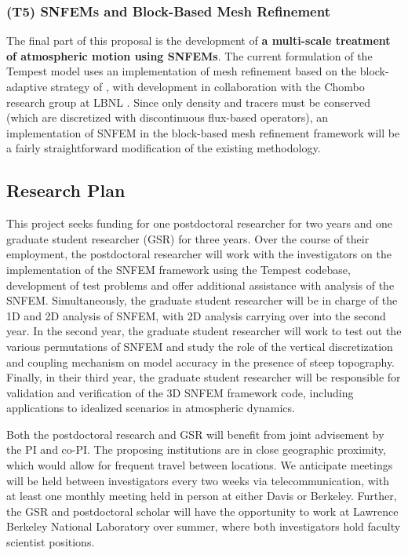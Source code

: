 \documentclass[11pt]{article}
\begin{document}
\vspace{-0.4cm}
\subsubsection{(T5) SNFEMs and Block-Based Mesh Refinement}

The final part of this proposal is the development of \textbf{a multi-scale treatment of atmospheric motion using SNFEMs}.  The current formulation of the Tempest model uses an implementation of mesh refinement based on the block-adaptive strategy of \cite{MJBPC1989JCP}, with development in collaboration with the Chombo research group at LBNL \cite{ChomboDesign}.  Since only density and tracers must be conserved (which are discretized with discontinuous flux-based operators), an implementation of SNFEM in the block-based mesh refinement framework will be a fairly straightforward modification of the existing methodology.

\subsection{Research Plan} \label{sec:ResearchPlan}

This project seeks funding for one postdoctoral researcher for two years and one graduate student researcher (GSR) for three years.  Over the course of their employment, the postdoctoral researcher will work with the investigators on the implementation of the SNFEM framework using the Tempest codebase, development of test problems and offer additional assistance with analysis of the SNFEM.  Simultaneously, the graduate student researcher will be in charge of the 1D and 2D analysis of SNFEM, with 2D analysis carrying over into the second year.  In the second year, the graduate student researcher will work to test out the various permutations of SNFEM and study the role of the vertical discretization and coupling mechanism on model accuracy in the presence of steep topography.  Finally, in their third year, the graduate student researcher will be responsible for validation and verification of the 3D SNFEM framework code, including applications to idealized scenarios in atmospheric dynamics.  

Both the postdoctoral research and GSR will benefit from joint advisement by the PI and co-PI.  The proposing institutions are in close geographic proximity, which would allow for frequent travel between locations.  We anticipate meetings will be held between investigators every two weeks via telecommunication, with at least one monthly meeting held in person at either Davis or Berkeley.  Further, the GSR and postdoctoral scholar will have the opportunity to work at Lawrence Berkeley National Laboratory over summer, where both investigators hold faculty scientist positions.
\end{document}
